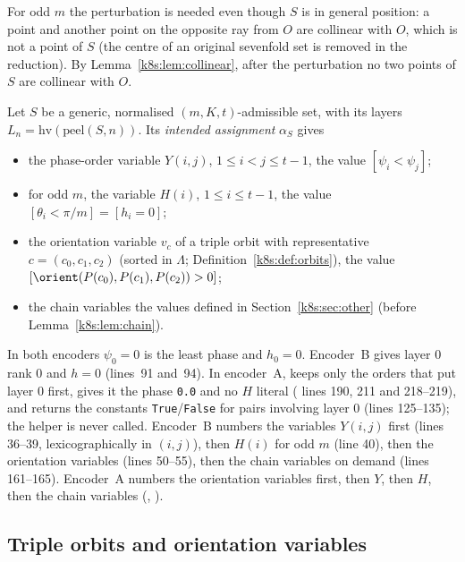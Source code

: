 For odd $m$ the perturbation is needed even though $S$ is in general position: a point and another point on the
opposite ray from $O$ are collinear with $O$, which is not a point of $S$ (the centre of an original sevenfold set is
removed in the reduction). By Lemma~\ref{k8s:lem:collinear}, after the perturbation no two points of $S$ are
collinear with $O$.

\begin{definition}\label{k8s:def:assign}
Let $S$ be a generic, normalised $(m,K,t)$-admissible set, with its layers $L_n=\mathrm{hv}(\mathrm{peel}(S,n))$. Its
\emph{intended assignment} $\alpha_S$ gives
\begin{itemize}
\item the phase-order variable $Y(i,j)$, $1\le i<j\le t-1$, the value $[\psi_i<\psi_j]$;
\item for odd $m$, the variable $H(i)$, $1\le i\le t-1$, the value $[\theta_i<\pi/m]=[h_i=0]$;
\item the orientation variable $v_c$ of a triple orbit with representative $c=(c_0,c_1,c_2)$ (sorted in $\Lambda$;
Definition~\ref{k8s:def:orbits}), the
value $[\orient(P(c_0),P(c_1),P(c_2))>0]$;
\item the chain variables the values defined in Section~\ref{k8s:sec:other} (before Lemma~\ref{k8s:lem:chain}).
\end{itemize}
\end{definition}

In both encoders $\psi_0=0$ is the least phase and $h_0=0$. Encoder~B gives layer $0$ rank $0$ and $h=0$ (lines~91
and~94). In encoder~A,  keeps only the orders that put layer $0$ first, gives it the phase
\texttt{0.0} and no $H$ literal ( lines 190, 211 and 218--219), and  returns the constants
\texttt{True}/\texttt{False} for pairs involving layer $0$ (lines 125--135); the helper  is never called.
Encoder~B numbers the variables
$Y(i,j)$ first (lines 36--39, lexicographically in $(i,j)$), then $H(i)$ for odd $m$ (line 40), then the orientation
variables (lines 50--55), then the chain variables on demand (lines 161--165). Encoder~A numbers the orientation
variables first, then $Y$, then $H$, then the chain variables (, ).

\subsection{Triple orbits and orientation variables}\label{k8s:sec:orbits}

